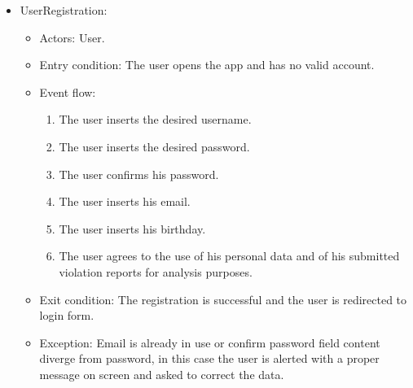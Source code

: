 \begin{itemize}
        \vskip 0.2in
        \item UserRegistration:
        \begin{itemize}
            \item Actors: User.
            \item Entry condition: The user opens the app and has no valid account.
            \item Event flow:
            \begin{enumerate}
                \item The user inserts the desired username.
                \item The user inserts the desired password.
                \item The user confirms his password.
                \item The user inserts his email.
                \item The user inserts his birthday.
                \item The user agrees to the use of his personal data and of his submitted violation reports for analysis purposes.
            \end{enumerate}
            \item Exit condition: The registration is successful and the user is redirected to login form.
            \item Exception: Email is already in use or confirm password field content diverge from password, in this case the user is alerted with a proper message on screen and asked to correct the data.
        \end{itemize}
    \end{itemize}